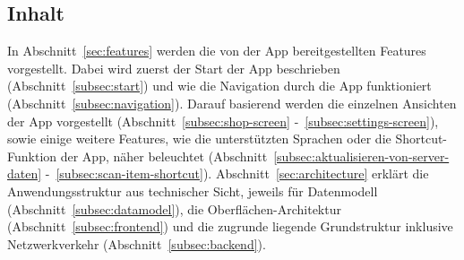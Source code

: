 \subsection{Inhalt}\label{subsec:inhalt}

In Abschnitt~\ref{sec:features} werden die von der App bereitgestellten Features vorgestellt.
Dabei wird zuerst der Start der App beschrieben (Abschnitt~\ref{subsec:start}) und wie die Navigation durch die App funktioniert (Abschnitt~\ref{subsec:navigation}).
Darauf basierend werden die einzelnen Ansichten der App vorgestellt (Abschnitt~\ref{subsec:shop-screen} -~\ref{subsec:settings-screen}), sowie einige weitere Features, wie die unterstützten Sprachen oder die Shortcut-Funktion der App, näher beleuchtet (Abschnitt~\ref{subsec:aktualisieren-von-server-daten} -~\ref{subsec:scan-item-shortcut}).
Abschnitt~\ref{sec:architecture} erklärt die Anwendungsstruktur aus technischer Sicht, jeweils für Datenmodell (Abschnitt~\ref{subsec:datamodel}), die Oberflächen-Architektur (Abschnitt~\ref{subsec:frontend}) und die zugrunde liegende Grundstruktur inklusive Netzwerkverkehr (Abschnitt~\ref{subsec:backend}).
